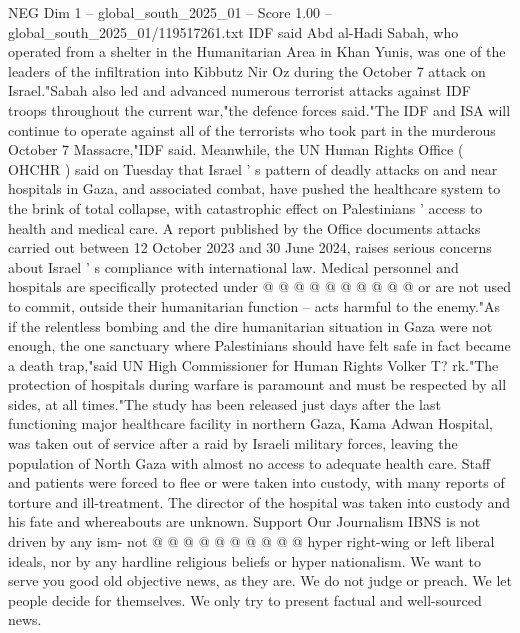 \begin{textsample}{NEG Dim 1 – global\_south\_2025\_01 – Score 1.00 – global\_south\_2025\_01/119517261.txt}  \label{ex:f1_neg_152}
IDF said Abd al-Hadi Sabah, who operated from a shelter in the Humanitarian Area in Khan Yunis, was one of the leaders of the infiltration into Kibbutz Nir Oz during the October 7 attack on Israel."Sabah also led and advanced numerous terrorist attacks against IDF troops throughout the current war,"the defence forces said."The IDF and ISA will continue to operate against all of the terrorists who took part in the murderous October 7 Massacre,"IDF said.
Meanwhile, the UN Human Rights Office ( OHCHR ) said on Tuesday that Israel ' s pattern of deadly attacks on and near hospitals in Gaza, and associated combat, have pushed the healthcare system to the brink of total collapse, with catastrophic effect on Palestinians ' access to health and medical care.
A report published by the Office documents attacks carried out between 12 October 2023 and 30 June 2024, raises serious concerns about Israel ' s compliance with international law.
Medical personnel and hospitals are specifically protected under @ @ @ @ @ @ @ @ @ @ or are not used to commit, outside their humanitarian function -- acts harmful to the enemy."As if the relentless bombing and the dire humanitarian situation in Gaza were not enough, the one sanctuary where Palestinians should have felt safe in fact became a death trap,"said UN High Commissioner for Human Rights Volker T? rk."The protection of hospitals during warfare is paramount and must be respected by all sides, at all times."The study has been released just days after the last functioning major healthcare facility in northern Gaza, Kama Adwan Hospital, was taken out of service after a raid by Israeli military forces, leaving the population of North Gaza with almost no access to adequate health care.
Staff and patients were forced to flee or were taken into custody, with many reports of torture and ill-treatment.
The director of the hospital was taken into custody and his fate and whereabouts are unknown.
Support Our Journalism IBNS is not driven by any ism- not @ @ @ @ @ @ @ @ @ @ hyper right-wing or left liberal ideals, nor by any hardline religious beliefs or hyper nationalism.
We want to serve you good old objective news, as they are.
We do not judge or preach.
We let people decide for themselves.
We only try to present factual and well-sourced news.

\end{textsample}

